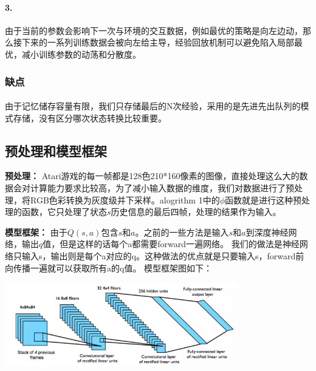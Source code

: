 \documentclass{article} %
\begin{document}
\begin{CJK*}{UTF8}{gkai}
\paragraph{3.}由于当前的参数会影响下一次与环境的交互数据，例如最优的策略是向左边动，那么接下来的一系列训练数据会被向左给主导，经验回放机制可以避免陷入局部最优，减小训练参数的动荡和分散度。
\subsubsection{缺点}
\paragraph{}由于记忆储存容量有限，我们只存储最后的N次经验，采用的是先进先出队列的模式存储，没有区分哪次状态转换比较重要。
\subsection{预处理和模型框架}
\textbf{预处理：} Atari游戏的每一帧都是128色210*160像素的图像，直接处理这么大的数据会对计算能力要求比较高，为了减小输入数据的维度，我们对数据进行了预处理，将RGB色彩转换为灰度级并下采样。alogrithm 1中的$\phi$函数就是进行这种预处理的函数，它只处理了状态$s$历史信息的最后四帧，处理的结果作为输入。

\textbf{模型框架：}
由于$Q\left(s,a\right)$包含$s$和$a$。之前的一些方法是输入$s$和$a$到深度神经网络，输出$q$值，但是这样的话每个a都需要forward一遍网络。
我们的做法是神经网络只输入s，输出则是每个a对应的q。这种做法的优点就是只要输入s，forward前向传播一遍就可以获取所有a的q值。
模型框架图如下：
\begin{center}
\includegraphics[width=4in]{dqn-atari.jpg}
\end{center}


\end{CJK*}
\end{document}
